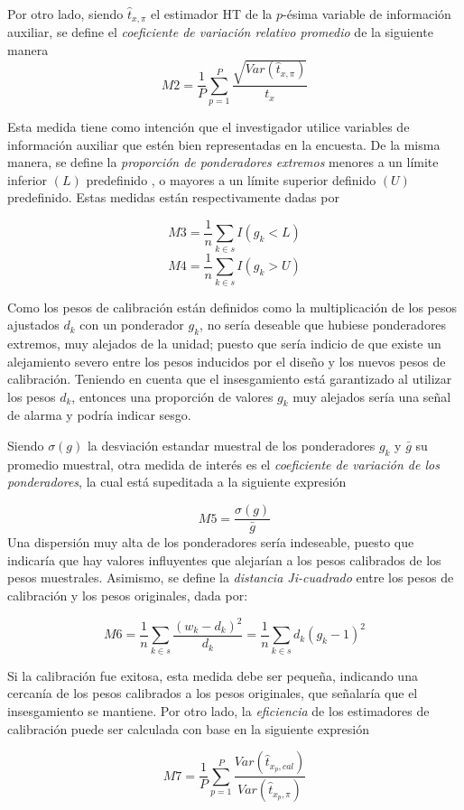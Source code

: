 \documentclass[
  12pt,
  spanish,
]{book}
\begin{document}
Por otro lado, siendo \(\hat{t}_{x, \pi}\) el estimador HT de la \(p\)-ésima variable de información auxiliar, se define el \emph{coeficiente de variación relativo promedio} de la siguiente manera
\[
M2= \frac{1}{P} \sum_{p=1}^P \frac{\sqrt{Var(\hat{t}_{x,\pi})}}{t_x} 
\]

Esta medida tiene como intención que el investigador utilice variables de información auxiliar que estén bien representadas en la encuesta. De la misma manera, se define la \emph{proporción de ponderadores extremos} menores a un límite inferior \((L)\) predefinido , o mayores a un límite superior definido \((U)\) predefinido. Estas medidas están respectivamente dadas por

\[
M3 = \frac{1}{n} \sum_{k \in s}I(g_k<L)
\]
\[
M4= \frac{1}{n} \sum_{k \in s}I(g_k>U)
\]

Como los pesos de calibración están definidos como la multiplicación de los pesos ajustados \(d_{k}\) con un ponderador \(g_k\), no sería deseable que hubiese ponderadores extremos, muy alejados de la unidad; puesto que sería indicio de que existe un alejamiento severo entre los pesos inducidos por el diseño y los nuevos pesos de calibración. Teniendo en cuenta que el insesgamiento está garantizado al utilizar los pesos \(d_k\), entonces una proporción de valores \(g_k\) muy alejados sería una señal de alarma y podría indicar sesgo.

Siendo \(\sigma(g)\) la desviación estandar muestral de los ponderadores \(g_k\) y \(\bar{g}\) su promedio muestral, otra medida de interés es el \emph{coeficiente de variación de los ponderadores}, la cual está supeditada a la siguiente expresión

\[
M5= \frac{\sigma(g)}{\bar{g}}
\]
Una dispersión muy alta de los ponderadores sería indeseable, puesto que indicaría que hay valores influyentes que alejarían a los pesos calibrados de los pesos muestrales. Asimismo, se define la \emph{distancia Ji-cuadrado} entre los pesos de calibración y los pesos originales, dada por:

\[
M6 = \frac{1}{n}\sum_{k \in s} \frac{(w_k - d_k)^2}{d_k}
= \frac{1}{n}\sum_{k \in s} d_k(g_k - 1)^2
\]

Si la calibración fue exitosa, esta medida debe ser pequeña, indicando una cercanía de los pesos calibrados a los pesos originales, que señalaría que el insesgamiento se mantiene. Por otro lado, la \emph{eficiencia} de los estimadores de calibración puede ser calculada con base en la siguiente expresión

\[
M7 = \frac{1}{P}\sum_{p=1}^P \frac{Var(\hat{t}_{x_p, cal})}{Var(\hat{t}_{x_p, \pi})} 
\]
\end{document}

